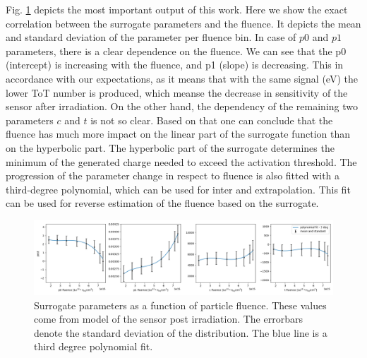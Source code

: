 Fig. \ref{fig:surrogate_fluence} depicts the most important output of this work. Here we show the exact correlation between the surrogate parameters and the fluence. It depicts the mean and standard deviation of the parameter per fluence bin. In case of $p0$ and $p1$ parameters, there is a clear dependence on the fluence. We can see that the p0 (intercept) is increasing with the fluence, and p1 (slope) is decreasing.
This in accordance with our expectations, as it means that with the same signal (eV) the lower ToT number is produced, which meanse the decrease in sensitivity of the sensor after irradiation.
On the other hand, the dependency of the remaining two parameters $c$ and $t$ is not so clear.
Based on that one can conclude that the fluence has much more impact on the linear part of the surrogate function than on the hyperbolic part.
The hyperbolic part of the surrogate determines the minimum of the generated charge needed to exceed the activation threshold. 
The progression of the parameter change in respect to fluence is also fitted with a third-degree polynomial, which can be used for inter and extrapolation. This fit can be used for reverse estimation of the fluence based on the surrogate.

\begin{figure}
\centering
\includegraphics[width=1.\textwidth]{figures/chapter4/surrogates/p3_pre_post_fluences.png}
\caption{Surrogate parameters as a function of particle fluence. These values come from model of the sensor post irradiation. The errorbars denote the standard deviation of the distribution. The blue line is a third degree polynomial fit.}
\label{fig:surrogate_fluence}
\end{figure}

